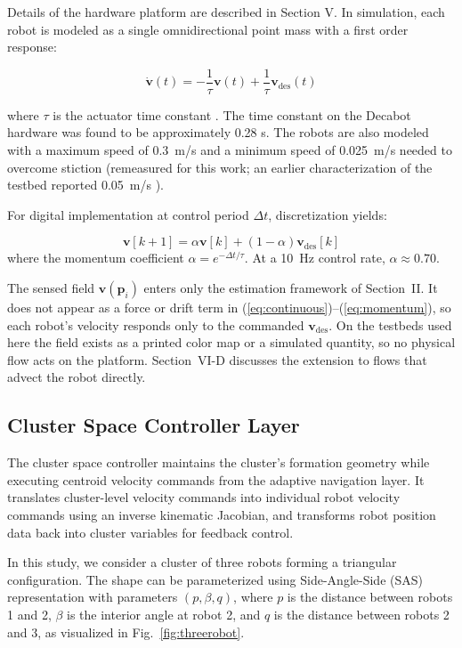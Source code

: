 \documentclass[lettersize,journal]{IEEEtran}
\begin{document}
Details of the hardware platform are described in Section V.
In simulation, each robot is modeled as a single omnidirectional point mass with a first order response:

\begin{equation}
    \dot{\mathbf{v}}(t) = -\frac{1}{\tau}\mathbf{v}(t) + \frac{1}{\tau}\mathbf{v}_{\text{des}}(t)
    \label{eq:continuous}
    \end{equation}

where $\tau$ is the actuator time constant \cite{4,7}. The time constant on the Decabot hardware was found to be approximately 0.28 s.  The robots are also modeled with a maximum speed of 0.3~m/s and a minimum speed of 0.025~m/s needed to overcome stiction (remeasured for this work; an earlier characterization of the testbed reported 0.05~m/s \cite{22}).

For digital implementation at control period $\Delta t$, discretization yields:

\begin{equation}
\mathbf{v}[k+1] = \alpha \mathbf{v}[k] + (1-\alpha)\mathbf{v}_{\text{des}}[k]
\label{eq:momentum}
\end{equation}
where the momentum coefficient $\alpha = e^{-\Delta t/\tau}$. At a 10~Hz control rate, $\alpha \approx 0.70$.

The sensed field $\mathbf{v}(\mathbf{p}_i)$ enters only the estimation framework of Section~II. It does not appear as a force or drift term in (\ref{eq:continuous})--(\ref{eq:momentum}), so each robot's velocity responds only to the commanded $\mathbf{v}_{\text{des}}$. On the testbeds used here the field exists as a printed color map or a simulated quantity, so no physical flow acts on the platform. Section~VI-D discusses the extension to flows that advect the robot directly.


\subsection{Cluster Space Controller Layer}

The cluster space controller maintains the cluster's formation geometry while executing centroid velocity commands from the adaptive navigation layer. It translates cluster-level velocity commands into individual robot velocity commands using an inverse kinematic Jacobian, and transforms robot position data back into cluster variables for feedback control.

In this study, we consider a cluster of three robots forming a triangular configuration. The shape can be parameterized using Side-Angle-Side (SAS) representation with parameters $(p, \beta, q)$, where $p$ is the distance between robots 1 and 2, $\beta$ is the interior angle at robot 2, and $q$ is the distance between robots 2 and 3, as visualized in Fig.~\ref{fig:threerobot}.
\end{document}
